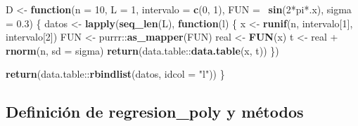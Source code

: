 \documentclass[]{tufte-handout}
\newenvironment{Shaded}{}{}
\newcommand{\ControlFlowTok}[1]{\textcolor[rgb]{0.00,0.44,0.13}{\textbf{#1}}}
\newcommand{\DataTypeTok}[1]{\textcolor[rgb]{0.56,0.13,0.00}{#1}}
\newcommand{\DecValTok}[1]{\textcolor[rgb]{0.25,0.63,0.44}{#1}}
\newcommand{\FloatTok}[1]{\textcolor[rgb]{0.25,0.63,0.44}{#1}}
\newcommand{\KeywordTok}[1]{\textcolor[rgb]{0.00,0.44,0.13}{\textbf{#1}}}
\newcommand{\NormalTok}[1]{#1}
\newcommand{\OperatorTok}[1]{\textcolor[rgb]{0.40,0.40,0.40}{#1}}
\newcommand{\StringTok}[1]{\textcolor[rgb]{0.25,0.44,0.63}{#1}}
\begin{document}
\begin{Shaded}
\begin{Highlighting}[]
\NormalTok{D <-}\StringTok{ }\ControlFlowTok{function}\NormalTok{(}\DataTypeTok{n =} \DecValTok{10}\NormalTok{, }\DataTypeTok{L =} \DecValTok{1}\NormalTok{, }\DataTypeTok{intervalo =} \KeywordTok{c}\NormalTok{(}\DecValTok{0}\NormalTok{, }\DecValTok{1}\NormalTok{), }\DataTypeTok{FUN =} \OperatorTok{~}\KeywordTok{sin}\NormalTok{(}\DecValTok{2}\OperatorTok{*}\NormalTok{pi}\OperatorTok{*}\NormalTok{.x), }\DataTypeTok{sigma =} \FloatTok{0.3}\NormalTok{) \{}
\NormalTok{  datos <-}\StringTok{ }\KeywordTok{lapply}\NormalTok{(}\KeywordTok{seq_len}\NormalTok{(L), }\ControlFlowTok{function}\NormalTok{(l) \{}
\NormalTok{    x <-}\StringTok{ }\KeywordTok{runif}\NormalTok{(n, intervalo[}\DecValTok{1}\NormalTok{], intervalo[}\DecValTok{2}\NormalTok{])}
\NormalTok{    FUN <-}\StringTok{ }\NormalTok{purrr}\OperatorTok{::}\KeywordTok{as_mapper}\NormalTok{(FUN)}
\NormalTok{    real <-}\StringTok{ }\KeywordTok{FUN}\NormalTok{(x)}
\NormalTok{    t <-}\StringTok{ }\NormalTok{real }\OperatorTok{+}\StringTok{ }\KeywordTok{rnorm}\NormalTok{(n, }\DataTypeTok{sd =}\NormalTok{ sigma)}
    \KeywordTok{return}\NormalTok{(data.table}\OperatorTok{::}\KeywordTok{data.table}\NormalTok{(x, t))}
\NormalTok{  \})}
  
  \KeywordTok{return}\NormalTok{(data.table}\OperatorTok{::}\KeywordTok{rbindlist}\NormalTok{(datos, }\DataTypeTok{idcol =} \StringTok{"l"}\NormalTok{))}
\NormalTok{\}}
\end{Highlighting}
\end{Shaded}

\hypertarget{def-regr}{%
\subsection{Definición de regresion\_poly y métodos}\label{def-regr}}
\end{document}
